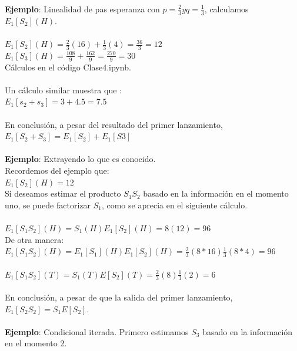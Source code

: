 \documentclass{article}
\begin{document}
        \textbf{Ejemplo}: Linealidad de pas esperanza con $p = \frac{2}{3} y q= \frac{1}{3}$, calculamos $E_1[S_2](H)$.
        \\
        \\
        $E_1[S_2](H) = \frac{2}{3} (16) + \frac{1}{3} (4) = \frac{36}{3} = 12$
        \\
        $E_1[S_3](H) = \frac{108}{9} + \frac{162}{9} = \frac{270}{9} = 30$
        \\Cálculos en el código Clase4.ipynb.
        \\
        \\
        Un cálculo similar muestra que :
        \\
        $E_1[s_2 + s_3] = 3 + 4.5 = 7.5$
        \\
        \\En conclusión, a pesar del resultado del primer lanzamiento,
        \\
        $E_1[S_2 + S_3] = E_1[S_2] + E_1[S3]$
        \\
        \\
        \textbf{Ejemplo}: Extrayendo lo que es conocido.
        \\
        Recordemos del ejemplo que:
        \\
        $E_1[S_2](H) = 12$
        \\
        Si deseamos estimar el producto $S_1 S_2$ basado en la información en el momento uno, se puede factorizar $S_1$, como se aprecia en el siguiente cálculo.
        \\
        \\
        $E_1[S_1 S_2](H) = S_1(H) E_1[S_2](H) = 8(12) = 96$
        \\
        De otra manera:
        \\
        $E_1[S_1 S_2](H) = E_1[S_1](H) E_1[S_2](H) = \frac{2}{3} (8*16) \frac{1}{3} (8*4) = 96$
        \\
        \\
        $E_1[S_1 S_2](T) = S_1(T) E[S_2](T) = \frac{2}{3}(8) \frac{1}{3} (2) = 6$
        \\
        \\
        En conclusión, a pesar de que la salida del primer lanzamiento, $E_1[S_2 S_2] = S_1 E[S_2]$.
        \\
        \\
        \textbf{Ejemplo}: Condicional iterada. Primero estimamos $S_3$ basado en la información en el momento 2.
        \\
        \\
\end{document}
